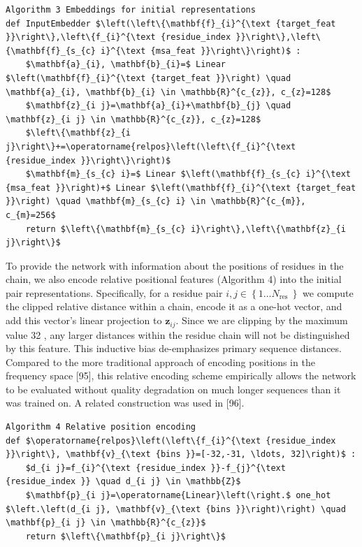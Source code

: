 \documentclass[10pt]{article}
\begin{document}
\begin{verbatim}
Algorithm 3 Embeddings for initial representations
def InputEmbedder $\left(\left\{\mathbf{f}_{i}^{\text {target_feat }}\right\},\left\{f_{i}^{\text {residue_index }}\right\},\left\{\mathbf{f}_{s_{c} i}^{\text {msa_feat }}\right\}\right)$ :
    $\mathbf{a}_{i}, \mathbf{b}_{i}=$ Linear $\left(\mathbf{f}_{i}^{\text {target_feat }}\right) \quad \mathbf{a}_{i}, \mathbf{b}_{i} \in \mathbb{R}^{c_{z}}, c_{z}=128$
    $\mathbf{z}_{i j}=\mathbf{a}_{i}+\mathbf{b}_{j} \quad \mathbf{z}_{i j} \in \mathbb{R}^{c_{z}}, c_{z}=128$
    $\left\{\mathbf{z}_{i j}\right\}+=\operatorname{relpos}\left(\left\{f_{i}^{\text {residue_index }}\right\}\right)$
    $\mathbf{m}_{s_{c} i}=$ Linear $\left(\mathbf{f}_{s_{c} i}^{\text {msa_feat }}\right)+$ Linear $\left(\mathbf{f}_{i}^{\text {target_feat }}\right) \quad \mathbf{m}_{s_{c} i} \in \mathbb{R}^{c_{m}}, c_{m}=256$
    return $\left\{\mathbf{m}_{s_{c} i}\right\},\left\{\mathbf{z}_{i j}\right\}$
\end{verbatim}

To provide the network with information about the positions of residues in the chain, we also encode relative positional features (Algorithm 4) into the initial pair representations. Specifically, for a residue pair $i, j \in\left\{1 \ldots N_{\text {res }}\right\}$ we compute the clipped relative distance within a chain, encode it as a one-hot vector, and add this vector's linear projection to $\mathbf{z}_{i j}$. Since we are clipping by the maximum value 32 , any larger distances within the residue chain will not be distinguished by this feature. This inductive bias de-emphasizes primary sequence distances. Compared to the more traditional approach of encoding positions in the frequency space [95], this relative encoding scheme empirically allows the network to be evaluated without quality degradation on much longer sequences than it was trained on. A related construction was used in [96].

\begin{verbatim}
Algorithm 4 Relative position encoding
def $\operatorname{relpos}\left(\left\{f_{i}^{\text {residue_index }}\right\}, \mathbf{v}_{\text {bins }}=[-32,-31, \ldots, 32]\right)$ :
    $d_{i j}=f_{i}^{\text {residue_index }}-f_{j}^{\text {residue_index }} \quad d_{i j} \in \mathbb{Z}$
    $\mathbf{p}_{i j}=\operatorname{Linear}\left(\right.$ one_hot $\left.\left(d_{i j}, \mathbf{v}_{\text {bins }}\right)\right) \quad \mathbf{p}_{i j} \in \mathbb{R}^{c_{z}}$
    return $\left\{\mathbf{p}_{i j}\right\}$
\end{verbatim}
\end{document}
